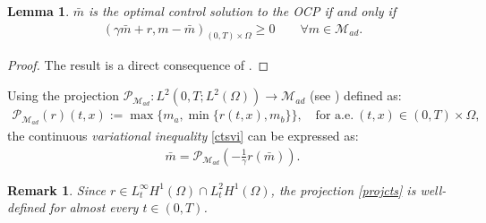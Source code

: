 \documentclass{amsart}
\newtheorem{remark}{Remark}[section]
\newtheorem{lemma}[theorem]{Lemma}
\newcommand{\LRp}[1]{\left( #1 \right)}
\begin{document}
\begin{lemma}
	$\bar{m}$ is the optimal control solution to the OCP if and only if
	\begin{align}\label{ctsvi}
		\left(\gamma \bar{m} + r ,m-\bar{m}\right)_{(0,T) \times \Omega} \ge 0 \qquad \forall m \in \mathcal{M}_{ad}.
	\end{align}
\end{lemma}
\begin{proof}
	The result is a direct consequence of \cite[Theorem~3.7]{MR4410836}.
\end{proof}
	Using the projection $\mathcal{P}_{\mathcal{M}_{ad}}:L^{2}(0,T;L^{2}(\Omega)) \rightarrow {\mathcal{M}_{ad}}$ (see \cite[Theorem~3.3]{MR3022219}) defined as:
	\begin{align}\label{mmproj}
		\mathcal{P}_{\mathcal{M}_{ad}}(r)(t,x):= \max\{m_{a},\min\{r(t,x), m_{b}\}\}, \quad \text{for a.e.} \ (t,x) \in (0,T) \times \Omega,
	\end{align}
the continuous \textit{variational inequality} \eqref{ctsvi} can be expressed as:
		\begin{align}\label{projcts}
			\bar{m} = \mathcal{P}_{\mathcal{M}_{ad}} \left(-\frac{1}{\gamma} r(\bar{m})\right).
	\end{align}
%
\begin{remark}
	Since $r \in L_t^{\infty} H^1(\Omega) \cap L_t^{2} H^1(\Omega)$, the projection \eqref{projcts} is well-defined for almost every $t\in (0,T)$. %
\end{remark}
%
\end{document}
